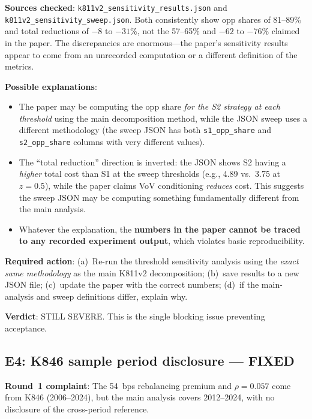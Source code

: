 \documentclass[12pt,a4paper]{article}
\begin{document}
\textbf{Sources checked}: \texttt{k811v2\_sensitivity\_results.json} and \texttt{k811v2\_sensitivity\_sweep.json}. Both consistently show opp shares of 81--89\% and total reductions of $-8$ to $-31$\%, not the 57--65\% and $-62$ to $-76$\% claimed in the paper. The discrepancies are enormous---the paper's sensitivity results appear to come from an unrecorded computation or a different definition of the metrics.

\textbf{Possible explanations}:
\begin{itemize}[leftmargin=2em]
\item The paper may be computing the opp share \emph{for the S2 strategy at each threshold} using the main decomposition method, while the JSON sweep uses a different methodology (the sweep JSON has both \texttt{s1\_opp\_share} and \texttt{s2\_opp\_share} columns with very different values).
\item The ``total reduction'' direction is inverted: the JSON shows S2 having a \emph{higher} total cost than S1 at the sweep thresholds (e.g., 4.89 vs.\ 3.75 at $z=0.5$), while the paper claims VoV conditioning \emph{reduces} cost. This suggests the sweep JSON may be computing something fundamentally different from the main analysis.
\item Whatever the explanation, the \textbf{numbers in the paper cannot be traced to any recorded experiment output}, which violates basic reproducibility.
\end{itemize}

\textbf{Required action}: (a)~Re-run the threshold sensitivity analysis using the \emph{exact same methodology} as the main K811v2 decomposition; (b)~save results to a new JSON file; (c)~update the paper with the correct numbers; (d)~if the main-analysis and sweep definitions differ, explain why.

\textbf{Verdict}: \textcolor{errorred}{STILL SEVERE.} This is the single blocking issue preventing acceptance.

\bigskip

\subsection*{\textcolor{fixedblue}{E4: K846 sample period disclosure --- FIXED}}

\textbf{Round~1 complaint}: The 54~bps rebalancing premium and $\rho = 0.057$ come from K846 (2006--2024), but the main analysis covers 2012--2024, with no disclosure of the cross-period reference.
\end{document}
